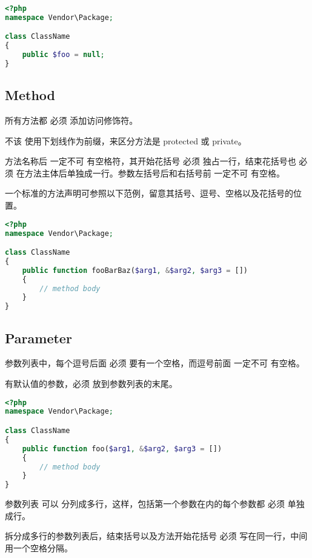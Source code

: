 \begin{lstlisting}[language=PHP]
<?php
namespace Vendor\Package;

class ClassName
{
    public $foo = null;
}
\end{lstlisting}


\subsection{Method}

\begin{compactitem}
\item 所有方法都 必须 添加访问修饰符。

\item 不该 使用下划线作为前缀，来区分方法是 protected 或 private。

\item 方法名称后 一定不可 有空格符，其开始花括号 必须 独占一行，结束花括号也 必须 在方法主体后单独成一行。参数左括号后和右括号前 一定不可 有空格。
\end{compactitem}


一个标准的方法声明可参照以下范例，留意其括号、逗号、空格以及花括号的位置。

\begin{lstlisting}[language=PHP]
<?php
namespace Vendor\Package;

class ClassName
{
    public function fooBarBaz($arg1, &$arg2, $arg3 = [])
    {
        // method body
    }
}
\end{lstlisting}

\subsection{Parameter}

参数列表中，每个逗号后面 必须 要有一个空格，而逗号前面 一定不可 有空格。

有默认值的参数，必须 放到参数列表的末尾。


\begin{lstlisting}[language=PHP]
<?php
namespace Vendor\Package;

class ClassName
{
    public function foo($arg1, &$arg2, $arg3 = [])
    {
        // method body
    }
}
\end{lstlisting}


参数列表 可以 分列成多行，这样，包括第一个参数在内的每个参数都 必须 单独成行。

拆分成多行的参数列表后，结束括号以及方法开始花括号 必须 写在同一行，中间用一个空格分隔。

